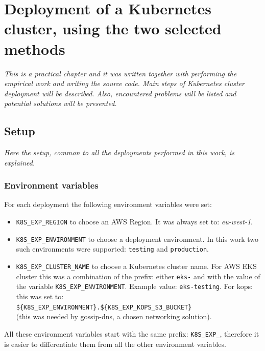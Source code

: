 \section{Deployment of a Kubernetes cluster, using the two selected methods}
\label{5-depl}
\textit{This is a practical chapter and it was written together with performing the empirical work and writing the source code. Main steps of Kubernetes cluster deployment will be described. Also, encountered problems will be listed and potential solutions will be presented.}
\\

\subsection{Setup}
\textit{Here the setup, common to all the deployments performed in this work, is explained.}
\\

\subsubsection{Environment variables}
For each deployment the following environment variables were set:
\begin{itemize}
\item \verb|K8S_EXP_REGION| to choose an AWS Region. It was always set to: \textit{eu-west-1}.
\item \verb|K8S_EXP_ENVIRONMENT| to choose a deployment environment. In this work two such environments were supported: \verb|testing| and \verb|production|.
\item \verb|K8S_EXP_CLUSTER_NAME| to choose a Kubernetes cluster name. For AWS EKS cluster this was a combination of the prefix: either \verb|eks-| and with the value of the variable \verb|K8S_EXP_ENVIRONMENT|. Example value: \verb|eks-testing|. For kops: this was set to: \\
\verb|${K8S_EXP_ENVIRONMENT}.${K8S_EXP_KOPS_S3_BUCKET}| \\
(this was needed by gossip-dns, a chosen networking solution).
\end{itemize}

All these environment variables start with the same prefix: \verb|K8S_EXP_|, therefore it is easier to differentiate them from all the other environment variables.

